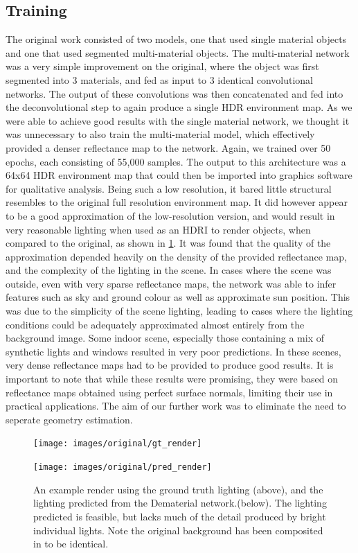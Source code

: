 \documentclass[ %
                    author={Gavin Parker},
                supervisor={Dr. Neill Campbell},
                    degree={MEng},
                     title={Deep Siamese Networks for Illumination Estimation from Stereo Images},
                  subtitle={},
                      type={research},
                      year={2018} ]{dissertation}
\begin{document}
\subsection{Training}
The original work consisted of two models, one that used single material objects and one that used segmented multi-material objects. The multi-material network was a very simple improvement on the original, where the object was first segmented into 3 materials, and fed as input to 3 identical convolutional networks. The output of these convolutions was then concatenated and fed into the deconvolutional step to again produce a single HDR environment map. As we were able to achieve good results with the single material network, we thought it was unnecessary to also train the multi-material model, which effectively provided a denser reflectance map to the network. Again, we trained over 50 epochs, each consisting of 55,000 samples. The output to this architecture was a 64x64 HDR environment map that could then be imported into graphics software for qualitative analysis. Being such a low resolution, it bared little structural resembles to the original full resolution environment map. It did however appear to be a good approximation of the low-resolution version, and would result in very reasonable lighting when used as an HDRI to render objects, when compared to the original, as shown in \ref{fig:demat_eg1}.
\newline
It was found that the quality of the approximation depended heavily on the density of the provided reflectance map, and the complexity of the lighting in the scene. In cases where the scene was outside, even with very sparse reflectance maps, the network was able to infer features such as sky and ground colour as well as approximate sun position. This was due to the simplicity of the scene lighting, leading to cases where the lighting conditions could be adequately approximated almost entirely from the background image. Some indoor scene, especially those containing a mix of synthetic lights and windows resulted in very poor predictions. In these scenes, very dense reflectance maps had to be provided to produce good results.
\newline
It is important to note that while these results were promising, they were based on reflectance maps obtained using perfect surface normals, limiting their use in practical applications. The aim of our further work was to eliminate the need to seperate geometry estimation.
\begin{figure}[H]
\centering
\texttt{[image: images/original/gt\_render]}
\vspace{0.5cm}

\centering
\texttt{[image: images/original/pred\_render]}
\caption{An example render using the ground truth lighting (above), and the lighting predicted from the Dematerial network.(below). The lighting predicted is feasible, but lacks much of the detail produced by bright individual lights. Note the original background has been composited in to be identical.}
\label{fig:demat_eg1}
\end{figure}
\end{document}
